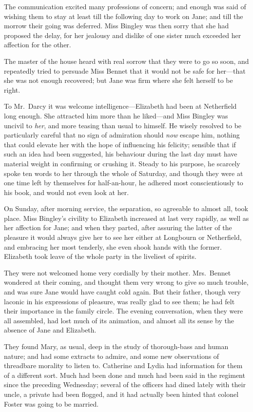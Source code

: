\documentclass[12pt,english,oneside]{book}
\begin{document}
The communication excited many professions of concern; and enough
was said of wishing them to stay at least till the following day to
work on Jane; and till the morrow their going was deferred. Miss Bingley
was then sorry that she had proposed the delay, for her jealousy and
dislike of one sister much exceeded her affection for the other.

The master of the house heard with real sorrow that they were to go
so soon, and repeatedly tried to persuade Miss Bennet that it would
not be safe for her\mbox{---}that she was not enough recovered; but
Jane was firm where she felt herself to be right.

To Mr.\ Darcy it was welcome in\-t\-el\-li\-g\-ence\mbox{---}Elizabeth
had been at Netherfield long enough. She attracted him more than he
liked\mbox{---}and Miss Bingley was uncivil to \textit{her}, and
more teasing than usual to himself. He wisely resolved to be particularly
careful that no sign of admiration should \textit{now} escape him,
nothing that could elevate her with the hope of influencing his felicity;
sensible that if such an idea had been suggested, his behaviour during
the last day must have material weight in confirming or crushing it.
Steady to his purpose, he scarcely spoke ten words to her through
the whole of Saturday, and though they were at one time left by themselves
for half-an-hour, he adhered most conscientiously to his book, and
would not even look at her.

On Sunday, after morning service, the separation, so agreeable to
almost all, took place. Miss Bingley's civility to Elizabeth increased
at last very rapidly, as well as her affection for Jane; and when
they parted, after assuring the latter of the pleasure it would always
give her to see her either at Longbourn or Netherfield, and embracing
her most tenderly, she even shook hands with the former. Elizabeth
took leave of the whole party in the liveliest of spirits.

They were not welcomed home very cordially by their mother. Mrs.\ Bennet
wondered at their coming, and thought them very wrong to give so much
trouble, and was sure Jane would have caught cold again. But their
father, though very laconic in his expressions of pleasure, was really
glad to see them; he had felt their importance in the family circle.
The evening conversation, when they were all assembled, had lost much
of its animation, and almost all its sense by the absence of Jane
and Elizabeth.

They found Mary, as usual, deep in the study of thorough-bass and
human nature; and had some extracts to admire, and some new observations
of threadbare morality to listen to. Catherine and Lydia had information
for them of a different sort. Much had been done and much had been
said in the regiment since the preceding Wednesday; several of the
officers had dined lately with their uncle, a private had been flogged,
and it had actually been hinted that colonel Foster was going to be
married.
\end{document}
